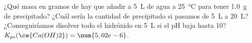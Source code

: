 ¿Qué masa en gramos de  hay que añadir a \SI{5}{\liter} de agua a \SI{25}{\celsius} para tener \SI{1,0}{\gram} de precipitado? 
¿Cuál sería la cantidad de precipitado si pasamos de \SI{5}{\liter} a \SI{20}{\liter}?
¿Conseguiríamos disolver todo el hidróxido en \SI{5}{\liter} si el pH baja hasta \num{10}?\\
$K_{ps}(\ce{Ca(OH)2}) = \num{5,02e-6}$.
